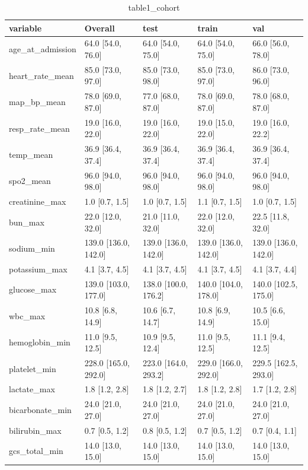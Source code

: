 \begin{table}[htbp]
\centering
\caption{table1_cohort}
\label{table1_cohort}
\begin{tabular}{lllll}
\toprule
variable & Overall & test & train & val \\
\midrule
age\_at\_admission & 64.0 [54.0, 76.0] & 64.0 [54.0, 75.0] & 64.0 [54.0, 75.0] & 66.0 [56.0, 78.0] \\
heart\_rate\_mean & 85.0 [73.0, 97.0] & 85.0 [73.0, 98.0] & 85.0 [73.0, 97.0] & 86.0 [73.0, 96.0] \\
map\_bp\_mean & 78.0 [69.0, 87.0] & 77.0 [68.0, 87.0] & 78.0 [69.0, 87.0] & 78.0 [68.0, 87.0] \\
resp\_rate\_mean & 19.0 [16.0, 22.0] & 19.0 [16.0, 22.0] & 19.0 [15.0, 22.0] & 19.0 [16.0, 22.2] \\
temp\_mean & 36.9 [36.4, 37.4] & 36.9 [36.4, 37.4] & 36.9 [36.4, 37.4] & 36.9 [36.4, 37.4] \\
spo2\_mean & 96.0 [94.0, 98.0] & 96.0 [94.0, 98.0] & 96.0 [94.0, 98.0] & 96.0 [94.0, 98.0] \\
creatinine\_max & 1.0 [0.7, 1.5] & 1.0 [0.7, 1.5] & 1.1 [0.7, 1.5] & 1.0 [0.7, 1.5] \\
bun\_max & 22.0 [12.0, 32.0] & 21.0 [11.0, 32.0] & 22.0 [12.0, 32.0] & 22.5 [11.8, 32.0] \\
sodium\_min & 139.0 [136.0, 142.0] & 139.0 [136.0, 142.0] & 139.0 [136.0, 142.0] & 139.0 [136.0, 142.0] \\
potassium\_max & 4.1 [3.7, 4.5] & 4.1 [3.7, 4.5] & 4.1 [3.7, 4.5] & 4.1 [3.7, 4.4] \\
glucose\_max & 139.0 [103.0, 177.0] & 138.0 [100.0, 176.2] & 140.0 [104.0, 178.0] & 140.0 [102.5, 175.0] \\
wbc\_max & 10.8 [6.8, 14.9] & 10.6 [6.7, 14.7] & 10.8 [6.9, 14.9] & 10.5 [6.6, 15.0] \\
hemoglobin\_min & 11.0 [9.5, 12.5] & 10.9 [9.5, 12.4] & 11.0 [9.5, 12.5] & 11.1 [9.4, 12.5] \\
platelet\_min & 228.0 [165.0, 292.0] & 223.0 [164.0, 293.2] & 229.0 [166.0, 292.0] & 229.5 [162.5, 293.0] \\
lactate\_max & 1.8 [1.2, 2.8] & 1.8 [1.2, 2.7] & 1.8 [1.2, 2.8] & 1.7 [1.2, 2.8] \\
bicarbonate\_min & 24.0 [21.0, 27.0] & 24.0 [21.0, 27.0] & 24.0 [21.0, 27.0] & 24.0 [21.0, 27.0] \\
bilirubin\_max & 0.7 [0.5, 1.2] & 0.8 [0.5, 1.2] & 0.7 [0.5, 1.2] & 0.7 [0.4, 1.1] \\
gcs\_total\_min & 14.0 [13.0, 15.0] & 14.0 [13.0, 15.0] & 14.0 [13.0, 15.0] & 14.0 [13.0, 15.0] \\

\end{tabular}
\end{table}
